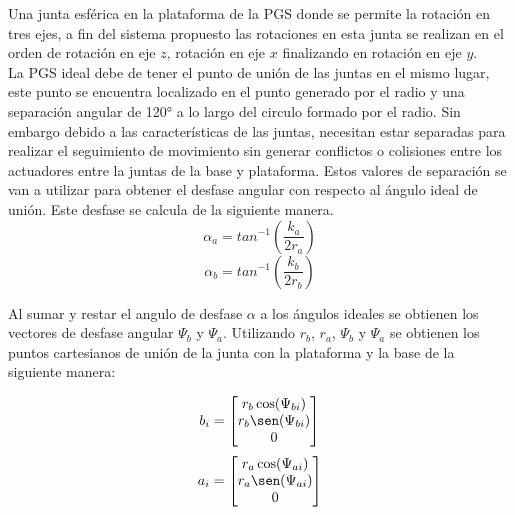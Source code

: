 Una junta esférica en la plataforma de la PGS donde se permite la rotación 
en tres ejes, a fin del sistema propuesto las rotaciones en esta junta se 
realizan en el orden de rotación en eje $z$, rotación en eje $x$ finalizando en 
rotación en eje $y$.\\

La PGS ideal debe de tener el punto de unión de las juntas en el mismo lugar, este 
punto se encuentra localizado en el punto generado por el radio y una separación angular 
de 120° a lo largo del circulo formado por el radio. Sin 
embargo debido a las características de las juntas, necesitan estar separadas para 
realizar el seguimiento de movimiento sin generar conflictos o colisiones entre los 
actuadores entre la juntas de la base y plataforma. Estos valores de separación se van 
a utilizar para obtener el desfase angular con respecto al ángulo ideal de unión. Este 
desfase se calcula de la siguiente manera. \\

\begin{equation} \label{equ:azi-a}
\alpha_a = tan^{-1}\left(\frac{k_a}{2r_a}\right)
\end{equation}
\begin{equation} \label{equ:azi-b}
\alpha_b = tan^{-1}\left(\frac{k_b}{2r_b}\right)
\end{equation}

Al sumar y restar el angulo de desfase $\alpha$ a los ángulos ideales se obtienen 
los vectores de desfase angular $\Psi_b$ y $\Psi_a$. Utilizando $r_b$, $r_a$, 
$\Psi_b$ y $\Psi_a$ se obtienen los puntos cartesianos de unión de la junta 
con la plataforma y la base de la siguiente manera:

\begin{equation} \label{equ:p_b}
b_i = \begin{bmatrix}
r_b\cos(\Psi_{bi})\\
r_b\sen(\Psi_{bi})\\
0\\
\end{bmatrix}
\end{equation}
\begin{equation} \label{equ:p_a}
a_i = \begin{bmatrix}
r_a\cos(\Psi_{ai})\\
r_a\sen(\Psi_{ai})\\
0\\
\end{bmatrix}
\end{equation}

